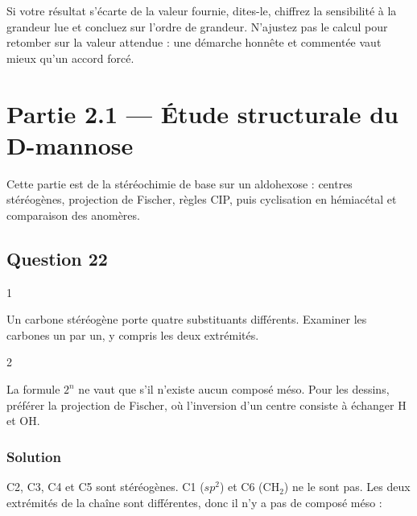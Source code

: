 \documentclass[11pt,a4paper]{article}
\begin{document}
\begin{jury}

Si votre résultat s'écarte de la valeur fournie, dites-le, chiffrez la sensibilité à la grandeur lue et concluez sur l'ordre de grandeur. N'ajustez pas le calcul pour retomber sur la valeur attendue : une démarche honnête et commentée vaut mieux qu'un accord forcé.

\end{jury}

\hypertarget{partie-2.1-uxe9tude-structurale-du-d-mannose}{%
\section{Partie 2.1 --- Étude structurale du D-mannose}\label{partie-2.1-uxe9tude-structurale-du-d-mannose}}

Cette partie est de la stéréochimie de base sur un aldohexose : centres stéréogènes, projection de Fischer, règles CIP, puis cyclisation en hémiacétal et comparaison des anomères.

\hypertarget{question-22}{%
\subsection{Question 22}\label{question-22}}

\begin{indication}{1}

Un carbone stéréogène porte quatre substituants différents. Examiner les carbones un par un, y compris les deux extrémités.

\end{indication}

\begin{indication}{2}

La formule \(2^n\) ne vaut que s'il n'existe aucun composé méso. Pour les dessins, préférer la projection de Fischer, où l'inversion d'un centre consiste à échanger H et OH.

\end{indication}

\hypertarget{solution-21}{%
\subsubsection{Solution}\label{solution-21}}

C2, C3, C4 et C5 sont stéréogènes. C1 (\(sp^2\)) et C6 (\(\mathrm{CH_2}\)) ne le sont pas. Les deux extrémités de la chaîne sont différentes, donc il n'y a pas de composé méso :
\end{document}
